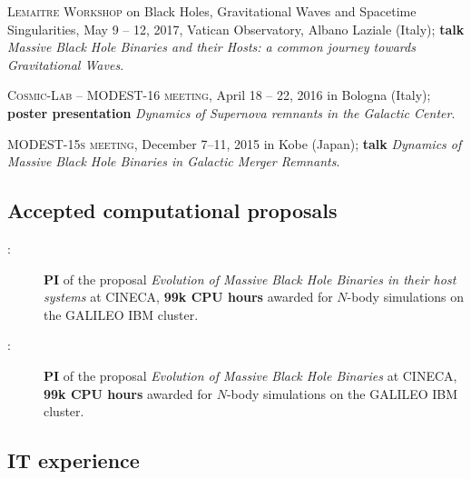 \documentclass[11pt,a4paper]{article}
\begin{document}
\begin{etaremune}
\begin{itemize}[leftmargin=5mm]
    \end{itemize}
    \vspace{-8pt}

    \item \textsc{Lemaitre Workshop}  on Black Holes, Gravitational Waves and Spacetime Singularities, May 9 -- 12, 2017, Vatican Observatory, Albano Laziale (Italy); {\bf talk} {\it Massive Black Hole Binaries and their Hosts: a common journey towards Gravitational Waves}.

    \item \textsc{Cosmic-Lab – MODEST-16 meeting},  April 18 -- 22, 2016 in Bologna (Italy); {\bf poster presentation} {\it Dynamics of Supernova remnants in the Galactic Center}.

    \item \textsc{MODEST-15s meeting}, December 7--11, 2015 in Kobe (Japan);  {\bf talk} {\it Dynamics of Massive Black Hole Binaries in Galactic Merger Remnants}.

\end{etaremune}


\subsection*{Accepted computational proposals}

\begin{description}

    \item[:] \textbf{PI} of the proposal\textit{ Evolution of Massive Black Hole Binaries in their host systems} at CINECA, {\bf 99k CPU hours} awarded for $N$-body simulations on the GALILEO IBM cluster.

    \item[ :] \textbf{PI} of the proposal \textit{Evolution of Massive Black Hole Binaries} at CINECA, {\bf 99k CPU hours} awarded for $N$-body simulations on the GALILEO IBM cluster.
\end{description}

\subsection*{IT experience}
\end{document}
